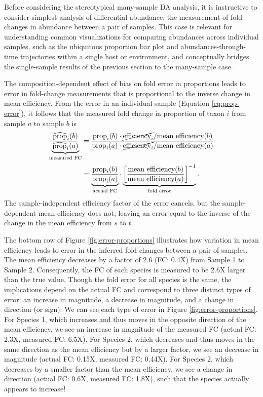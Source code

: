 \documentclass[
]{article}
\begin{document}
Before considering the stereotypical many-sample DA analysis, it is instructive to
consider simplest analysis of differential abundance: the measurement of fold changes in abundance between a pair of samples.
This case is relevant for understanding common visualizations for comparing abundances across individual samples, such as the ubiquitous proportion bar plot and abundances-through-time trajectories within a single host or environment, and conceptually bridges the single-sample results of the previous section to the many-sample case.

The composition-dependent effect of bias on fold error in proportions leads to error in fold-change measurements that is proportional to the inverse change in mean efficiency.
From the error in an individual sample (Equation \eqref{eq:prop-error}), it follows that the measured fold change in proportion of taxon \(i\) from sample \(a\) to sample \(b\) is
\begin{align}
  \label{eq:prop-fc-error}
\underbrace{\frac{\widehat{\text{prop}}_{i}(b)}{\widehat{\text{prop}}_{i}(a)}} _\text{measured FC}
  &= \frac
    {\text{prop}_{i}(b) \cdot \cancel{\text{efficiency}_{i}} / {\text{mean efficiency}(b)}}
    {\text{prop}_{i}(a) \cdot \cancel{\text{efficiency}_{i}} / {\text{mean efficiency}(a)}}
\\[0.5ex]
  &=
  \underbrace{\frac{\text{prop}_{i}(b)}{\text{prop}_{i}(a)}}_\text{actual FC}
  \cdot
  \underbrace{\left[\frac{\text{mean efficiency}(b)}{\text{mean efficiency}(a)}\right]^{-1}}_\text{fold error}
  .
\end{align}
The sample-independent efficiency factor of the error cancels, but the sample-dependent mean efficiency does not, leaving an error equal to the inverse of the change in the mean efficiency from \(s\) to \(t\).

The bottom row of Figure \ref{fig:error-proportions} illustrates how variation in mean efficiency leads to error in the inferred fold changes between a pair of samples.
The mean efficiency decreases by a factor of 2.6 (FC: 0.4X) from Sample 1 to Sample 2.
Consequently, the FC of each species is measured to be 2.6X larger than the true value.
Though the fold error for all species is the same, the implications depend on the actual FC and correspond to three distinct types of error: an increase in magnitude, a decrease in magnitude, and a change in direction (or sign).
We can see each type of error in Figure \ref{fig:error-proportions}.
For Species 1, which increases and thus moves in the opposite direction of the mean efficiency, we see an increase in magnitude of the measured FC (actual FC: 2.3X, measured FC: 6.5X).
For Species 2, which decreases and thus moves in the same direction as the mean efficiency but by a larger factor, we see an decrease in magnitude (actual FC: 0.15X, measured FC: 0.44X).
For Species 2, which decreases by a smaller factor than the mean efficiency, we see a change in direction (actual FC: 0.6X, measured FC: 1.8X), such that the species actually appears to increase!
\end{document}
